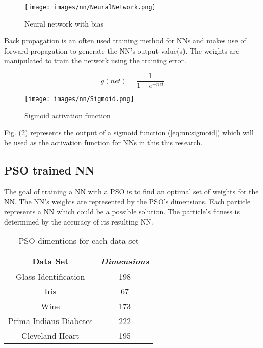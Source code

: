 \documentclass[conference]{IEEEtran}
\begin{document}
    	\begin{figure}[htbp]
\centerline{\texttt{[image: images/nn/NeuralNetwork.png]}}
\caption{Neural network with bias}
\label{fig:nn:configuration}
\end{figure}

    Back propagation is an often used training method for \ac{NN}s and makes use of forward propagation to generate the \ac{NN}'s output value(s). The weights are manipulated to train the network using the training error.
	
	\begin{equation} \label{eq:nn:sigmoid}
g(net) = \frac{1}{1 - e^{-net}}
\end{equation}
	
	\begin{figure}[htbp]
\centerline{\texttt{[image: images/nn/Sigmoid.png]}}
\caption{Sigmoid activation function}
\label{fig:nn:sigmoid}
\end{figure}

    Fig. (\ref{fig:nn:sigmoid}) represents the output of a sigmoid function (\ref{eq:nn:sigmoid}) which will be used as the activation function for \ac{NN}s in this this research.     

	\subsection{PSO trained NN}
	The goal of training a \ac{NN} with a \ac{PSO} is to find an optimal set of weights for the \ac{NN}. The \ac{NN}’s weights are represented by the \ac{PSO}'s dimensions. Each particle represents a \ac{NN} which could be a possible solution. The particle's fitness is determined by the accuracy of its resulting \ac{NN}.
    
    \begin{table}[htbp]
    \caption{PSO dimentions for each data set}
    \begin{center}
    \begin{tabular}{|c|c|}
    \hline
    \textbf{Data Set}& \textbf{\textit{Dimensions}}\\
    \hline
    Glass Identification& 198\\
    \hline
    Iris& 67\\
    \hline
    Wine& 173\\
    \hline
    Prima Indians Diabetes& 222\\
    \hline
    Cleveland Heart& 195\\
    \hline
    \end{tabular}
    \label{tab:pso:dimensions}
    \end{center}
    \end{table}
    
\end{document}
